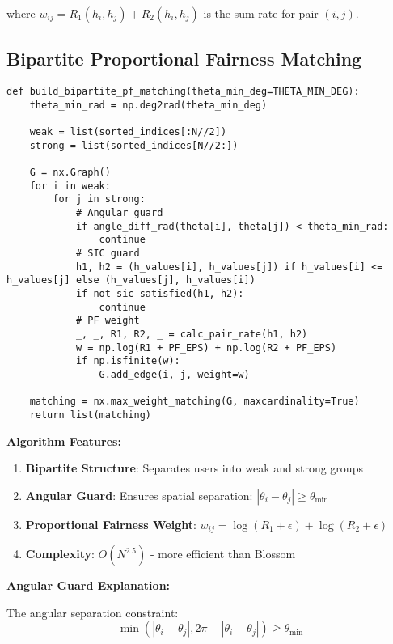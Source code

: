 \documentclass[11pt,a4paper]{article}
\begin{document}
where $w_{ij} = R_1(h_i, h_j) + R_2(h_i, h_j)$ is the sum rate for pair $(i,j)$.

\subsection{Bipartite Proportional Fairness Matching}

\begin{lstlisting}[caption={Bipartite PF Matching Implementation}]
def build_bipartite_pf_matching(theta_min_deg=THETA_MIN_DEG):
    theta_min_rad = np.deg2rad(theta_min_deg)
    
    weak = list(sorted_indices[:N//2])
    strong = list(sorted_indices[N//2:])
    
    G = nx.Graph()
    for i in weak:
        for j in strong:
            # Angular guard
            if angle_diff_rad(theta[i], theta[j]) < theta_min_rad:
                continue
            # SIC guard
            h1, h2 = (h_values[i], h_values[j]) if h_values[i] <= h_values[j] else (h_values[j], h_values[i])
            if not sic_satisfied(h1, h2):
                continue
            # PF weight
            _, _, R1, R2, _ = calc_pair_rate(h1, h2)
            w = np.log(R1 + PF_EPS) + np.log(R2 + PF_EPS)
            if np.isfinite(w):
                G.add_edge(i, j, weight=w)
    
    matching = nx.max_weight_matching(G, maxcardinality=True)
    return list(matching)
\end{lstlisting}

\textbf{Algorithm Features:}

\begin{enumerate}
    \item \textbf{Bipartite Structure}: Separates users into weak and strong groups
    \item \textbf{Angular Guard}: Ensures spatial separation: $|\theta_i - \theta_j| \geq \theta_{\min}$
    \item \textbf{Proportional Fairness Weight}: $w_{ij} = \log(R_1 + \epsilon) + \log(R_2 + \epsilon)$
    \item \textbf{Complexity}: $O(N^{2.5})$ - more efficient than Blossom
\end{enumerate}

\textbf{Angular Guard Explanation:}

The angular separation constraint:
\begin{equation}
\min(|\theta_i - \theta_j|, 2\pi - |\theta_i - \theta_j|) \geq \theta_{\min}
\end{equation}
\end{document}
